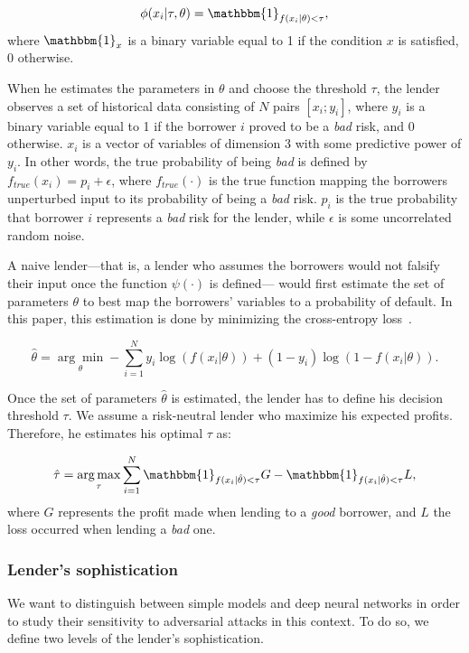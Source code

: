 \documentclass[12pt]{article} %
\begin{document}
\begin{equation}\label{equ:screening_algo}
\phi(x_i|\tau,\theta) = \mathbbm{1}_{f(x_i | \theta)<\tau},
\end{equation}
where $\mathbbm{1}_{x}$ is a binary variable equal to 1 if the condition $x$ is satisfied, 0 otherwise.

When he estimates the parameters in $\theta$ and choose the threshold $\tau$, the lender observes a set of historical data consisting of $N$ pairs $[x_i;y_i]$, where $y_i$ is a binary variable equal to 1 if the borrower $i$ proved to be a \textit{bad} risk, and 0 otherwise. $x_i$ is a vector of variables of dimension $3$ with some predictive power of $y_i$. In other words, the true probability of being \textit{bad} is defined by $f_{true}(x_i)=p_i+\epsilon$, where $f_{true}(\cdot)$ is the true function mapping the borrowers unperturbed input to its probability of being a \textit{bad} risk. $p_i$ is the true probability that borrower $i$ represents a \textit{bad} risk for the lender, while $\epsilon$ is some uncorrelated random noise. 

A naive lender---that is, a lender who assumes the borrowers would not falsify their input once the function $\psi(\cdot)$ is defined--- would first estimate the set of parameters $\theta$ to best map the borrowers' variables to a probability of default. In this paper, this estimation is done by minimizing the cross-entropy loss~\citep[see, e.g.,][]{goodfellow2014explaining}.

\begin{equation}\label{equ:entropy_loss}
\hat{\theta} = \underset{\theta}{\arg \min } -\sum_{i=1}^N y_i \log(f(x_i | \theta)) + (1-y_i) \log(1-f(x_i | \theta)).
\end{equation}

Once the set of parameters $\hat{\theta}$ is estimated, the lender has to define his decision threshold $\tau$. We assume a risk-neutral lender who maximize his expected profits. Therefore, he estimates his optimal $\tau$ as: 

\begin{equation}\label{equ:tau_find}
\hat{\tau} = \underset{\tau}{\arg \max} \sum_{i=1}^N 
\mathbbm{1}_{f(x_i | \hat{\theta})<\tau} G -  \mathbbm{1}_{f(x_i | \hat{\theta})<\tau} L,
\end{equation}
where $G$ represents the profit made when lending to a \textit{good} borrower, and $L$ the loss occurred when lending a \textit{bad} one. 


\subsubsection{Lender's sophistication}
We want to distinguish between simple models and deep neural networks in order to study their sensitivity to adversarial attacks in this context. To do so, we define two levels of the lender's sophistication. 
\end{document}
